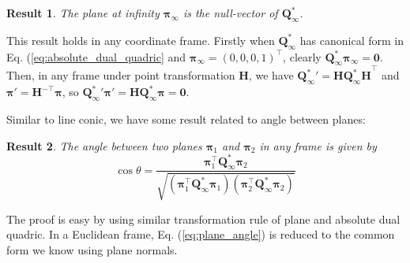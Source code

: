 \documentclass[12pt]{article}
\newtheorem{result}{Result}[section]
\numberwithin{equation}{section}
\begin{document}
\begin{result}
The plane at infinity $\bm{\pi}_{\infty}$ is the null-vector of $\mathbf{Q}_{\infty}^*$.
\end{result}

This result holds in any coordinate frame. Firstly when $\mathbf{Q}_{\infty}^*$ has canonical form in Eq. (\ref{eq:absolute_dual_quadric} and $\bm{\pi}_{\infty} = (0, 0, 0, 1)^\top$, clearly $\mathbf{Q}_{\infty}^* \bm{\pi}_{\infty} = \mathbf{0}$. Then, in any frame under point transformation $\mathbf{H}$, we have ${\mathbf{Q}_{\infty}^*}' = \mathbf{H}\mathbf{Q_{\infty}^* H}^{\top}$ and $\bm{\pi}' =  \mathbf{H}^{-\top}\bm{\pi}$, so ${\mathbf{Q}_{\infty}^*}' \bm{\pi}' = \mathbf{H}\mathbf{Q_{\infty}^*} \bm{\pi} = \mathbf{0}$.

Similar to line conic, we have some result related to angle between planes: \\
\begin{result}
The angle between two planes $\bm{\pi}_1$ and $\bm{\pi}_2$ in any frame is given by
\begin{equation}
\cos \theta = \frac{\bm{\pi}_1^\top\mathbf{Q}_{\infty}^* \bm{\pi}_2}{\sqrt{(\bm{\pi}_1^\top\mathbf{Q}_{\infty}^* \bm{\pi}_1)(\bm{\pi}_2^\top\mathbf{Q}_{\infty}^* \bm{\pi}_2)}}
\label{eq:plane_angle}
\end{equation}
\end{result}
The proof is easy by using similar transformation rule of plane and absolute dual quadric. In a Euclidean frame, Eq. (\ref{eq:plane_angle}) is reduced to the common form we know using plane normals. 

\newpage





\end{document}
